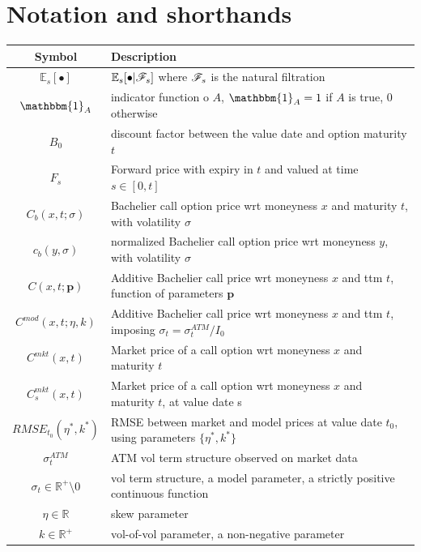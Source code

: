 \documentclass[12pt]{article}
\theoremstyle{definition}
\theoremstyle{remark}
\numberwithin{theorem}{section}
\numberwithin{proposition}{section}
\numberwithin{lemma}{section}
\numberwithin{corollary}{section}
\numberwithin{definition}{section}
\numberwithin{remark}{section}
\numberwithin{example}{section}
\newcommand{\E}{\mathbb{E}}
\newcommand{\R}{\mathbb{R}}
\begin{document}
\section*{Notation and shorthands}


	\hspace{-0.6cm}
	\begin{tabular} {|c|l|}
		\toprule
		\textbf{Symbol}& \textbf{Description}\\ \bottomrule
		$\E_s[\bullet]$ & $\E_s[\bullet | {\cal F}_s]$ where ${\cal F}_s$ is the natural filtration \\
		$\mathbbm{1}_A$ & indicator function o $A$, $\mathbbm{1}_A=1$ if $A$ is true, $0$ otherwise\\
		$B_0$ & discount factor between the value date and option maturity $t$ \\
		$F_s$ & Forward price with expiry in $t$ and valued at time $s \in [0,t]$ \\  
		$C_b \left(x, t; \sigma \right)$& Bachelier call option price wrt moneyness $x$ and maturity $t$, with volatility $\sigma$ \\
		$c_b(y,\sigma)$ & normalized Bachelier call option price wrt moneyness $y$, with volatility $\sigma$ \\
		$C \left(x, t; \mathbf{p} \right)$& Additive Bachelier call price wrt moneyness $x$ and ttm $t$, function of parameters $\mathbf{p}$ \\
		$C^{mod} \left(x, t; \eta,k \right)$& Additive Bachelier call price wrt moneyness $x$ and ttm $t$, imposing $\sigma_t=\sigma_t^{ATM}/I_0$ \\
		$C^{mkt} \left(x, t \right)$& Market price of a call option wrt moneyness $x$ and maturity $t$ \\
		$C_s^{mkt} \left(x, t \right)$& Market price of a call option wrt moneyness $x$ and maturity $t$, at value date s \\
		$RMSE_{t_0}(\eta^*, k^*)$ & RMSE between market and model prices at value date $t_0$, using parameters $\{\eta^*,k^*\}$\\
		${\sigma}^{ATM}_t$ & ATM vol term structure observed on market data\\
		${\sigma}_t \in \R^+ \setminus 0$ & vol term structure, a model parameter, a strictly positive continuous function\\
		${\eta} \in \R$ & skew parameter \\
		${k} \in \R^+$ & vol-of-vol parameter, a non-negative parameter\\

\end{tabular}
\end{document}
